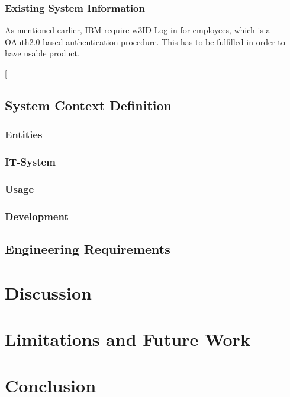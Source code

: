 \subsection{Existing System Information}
As mentioned earlier, IBM require w3ID-Log in for employees, which is a OAuth2.0 \parencite[cf.][]{InternetEngineeringTaskForce.2012} based authentication procedure. This has to be fulfilled in order to have  usable product. 
\begin{closeItem}
    \item [
\end{closeItem}
\paragraph{}

\section{System Context Definition}
\subsection{Entities}

\subsection{IT-System}

\subsection{Usage}

\subsection{Development}


\section{Engineering Requirements}


\chapter{Discussion}


\chapter{Limitations and Future Work}


\chapter{Conclusion}